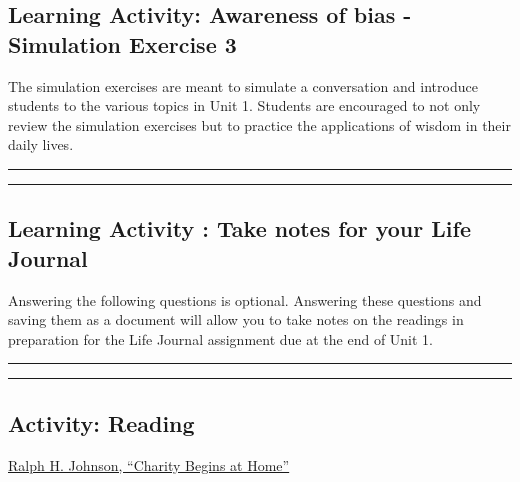 \documentclass[
]{book}
\begin{document}
\begin{reflect}
\end{reflect}

\hypertarget{learning-activity-awareness-of-bias---simulation-exercise-3}{%
\subsection{Learning Activity: Awareness of bias - Simulation Exercise 3}\label{learning-activity-awareness-of-bias---simulation-exercise-3}}

The simulation exercises are meant to simulate a conversation and introduce students to the various topics in Unit 1. Students are encouraged to not only review the simulation exercises but to practice the applications of wisdom in their daily lives.

\begin{center}\rule{0.5\linewidth}{0.5pt}\end{center}

\begin{center}\rule{0.5\linewidth}{0.5pt}\end{center}

\hypertarget{learning-activity-take-notes-for-your-life-journal-3}{%
\subsection{Learning Activity : Take notes for your Life Journal}\label{learning-activity-take-notes-for-your-life-journal-3}}

Answering the following questions is optional. Answering these questions and saving them as a document will allow you to take notes on the readings in preparation for the Life Journal assignment due at the end of Unit 1.

\begin{center}\rule{0.5\linewidth}{0.5pt}\end{center}

\begin{center}\rule{0.5\linewidth}{0.5pt}\end{center}

\hypertarget{activity-reading-3}{%
\subsection*{Activity: Reading}\label{activity-reading-3}}

\begin{reflect}
\href{assets/u1/CharityBeginsatHome.pdf}{Ralph H. Johnson, ``Charity Begins at Home''}
\end{reflect}
\end{document}
